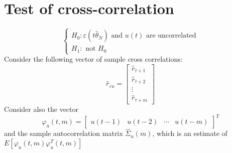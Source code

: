 \documentclass{book}
\begin{document}
\section{Test of cross-correlation}
\[
    \begin{cases}
        H_0: \varepsilon(t\hat{\theta}_N) \text{ and } u(t) \text{ are uncorrelated}\\
        H_1: \text{ not } H_0
    \end{cases}
\]
Consider the following vector of sample cross correlations:
\[
    \hat{r}_{\varepsilon u} = \begin{bmatrix}
        \hat{r}_{\bar{\tau}+1} \\
        \hat{r}_{\bar{\tau}+2} \\
        \vdots\\
        \hat{r}_{\bar{\tau}+m} 
    \end{bmatrix}
\]
Consider also the vector
\[
    \varphi_u(t,m) = \begin{bmatrix}
        u(t-1) & u(t-2) & \cdots & u(t-m)
    \end{bmatrix}^T
\]
and the sample autocorrelation matrix $\hat{\Sigma}_u(m)$, which is an estimate of $E[\varphi_u(t,m)\varphi_u^T(t,m)]$
\end{document}
